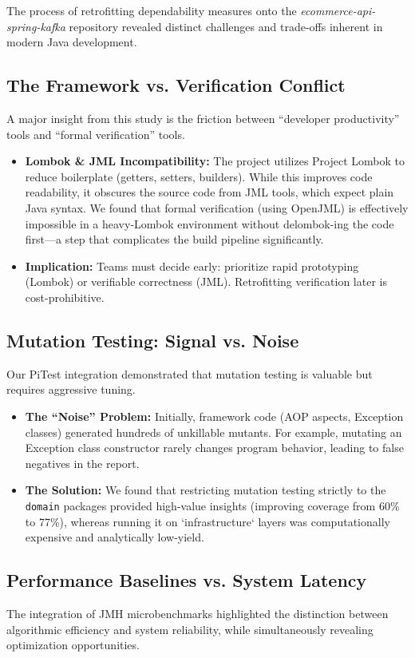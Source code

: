 The process of retrofitting dependability measures onto the \emph{ecommerce-api-spring-kafka} repository revealed distinct challenges and trade-offs inherent in modern Java development.

\subsection{The Framework vs. Verification Conflict}
A major insight from this study is the friction between ``developer productivity'' tools and ``formal verification'' tools.
\begin{itemize}
    \item \textbf{Lombok \& JML Incompatibility:} The project utilizes Project Lombok to reduce boilerplate (getters, setters, builders). While this improves code readability, it obscures the source code from JML tools, which expect plain Java syntax. We found that formal verification (using OpenJML) is effectively impossible in a heavy-Lombok environment without delombok-ing the code first—a step that complicates the build pipeline significantly.
    \item \textbf{Implication:} Teams must decide early: prioritize rapid prototyping (Lombok) or verifiable correctness (JML). Retrofitting verification later is cost-prohibitive.
\end{itemize}

\subsection{Mutation Testing: Signal vs. Noise}
Our PiTest integration demonstrated that mutation testing is valuable but requires aggressive tuning.
\begin{itemize}
    \item \textbf{The ``Noise'' Problem:} Initially, framework code (AOP aspects, Exception classes) generated hundreds of unkillable mutants. For example, mutating an Exception class constructor rarely changes program behavior, leading to false negatives in the report.
    \item \textbf{The Solution:} We found that restricting mutation testing strictly to the \texttt{domain} packages provided high-value insights (improving coverage from 60\% to 77\%), whereas running it on `infrastructure` layers was computationally expensive and analytically low-yield.
\end{itemize}

\subsection{Performance Baselines vs. System Latency}
The integration of JMH microbenchmarks highlighted the distinction between algorithmic efficiency and system reliability, while simultaneously revealing optimization opportunities.

